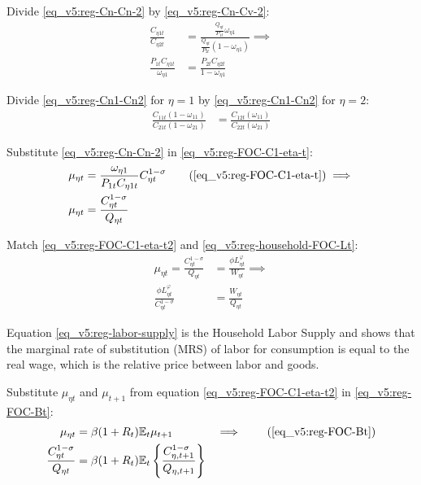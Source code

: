 \documentclass[../thesis.tex]{subfiles}
\begin{document}
\begin{tcolorbox}[colback=red!5!white,colframe=red!75!black]

Divide \ref{eq_v5:reg-Cn-Cn-2} by \ref{eq_v5:reg-Cn-Cv-2}:
\begin{align}
	\frac{C_{\eta 1 t}}{C_{\eta 2 t}} &= \frac{\frac{Q_{\eta t}}{P_{1 t}} \omega_{\eta 1}}{\frac{Q_{\eta t}}{P_{2 t}} (1 -\omega_{\eta 1})} \implies \nonumber \\
	\frac{P_{1 t} C_{\eta 1 t}}{\omega_{\eta 1}} &= \frac{P_{2 t} C_{\eta 2 t}}{1 -\omega_{\eta 1}} \label{eq_v5:reg-Cn1-Cn2}
\end{align}

Divide \ref{eq_v5:reg-Cn1-Cn2} for $\eta = 1$ by \ref{eq_v5:reg-Cn1-Cn2} for $\eta = 2$:
\begin{align}
	\frac{C_{11t}(1-\omega_{11})}{C_{21t}(1-\omega_{21})} &= \frac{C_{12t}(\omega_{11})}{C_{22t}(\omega_{21})} \label{eq_v5:reg-Cn1-Cn2-b}
\end{align}

\end{tcolorbox}

Substitute \ref{eq_v5:reg-Cn-Cn-2} in \ref{eq_v5:reg-FOC-C1-eta-t}:
\begin{align}
	\mu_{\eta t} &= \frac{\omega_{\eta 1}}{P_{1 t} C_{\eta 1 t}} C_{\eta t}^{1 -\sigma} \tag{\ref{eq_v5:reg-FOC-C1-eta-t}} \implies \\
	\mu_{\eta t} &= \frac{ C_{\eta t}^{1-\sigma}}{Q_{\eta t}} \label{eq_v5:reg-FOC-C1-eta-t2}
\end{align}

Match \ref{eq_v5:reg-FOC-C1-eta-t2} and \ref{eq_v5:reg-household-FOC-Lt}:
\begin{align}
	\mu_{\eta t} = \frac{ C_{\eta t}^{1-\sigma}}{Q_{\eta t}} &= \frac{\phi L_{\eta t}^{\varphi}}{W_{\eta t}} \implies \nonumber \\
	\frac{\phi L_{\eta t}^{\varphi}}{C_{\eta t}^{1-\sigma}} &= \frac{W_{\eta t}}{Q_{\eta t}} \label{eq_v5:reg-labor-supply}
\end{align}

Equation \ref{eq_v5:reg-labor-supply} is the Household Labor Supply and shows that the marginal rate of substitution (MRS) of labor for consumption is equal to the real wage, which is the relative price between labor and goods.

Substitute $\mu_{\eta t}$ and $\mu_{t+1}$ from equation \ref{eq_v5:reg-FOC-C1-eta-t2} in \ref{eq_v5:reg-FOC-Bt}:
\begin{alignat}{2}
	\mu_{\eta t} &= \beta (1 + R_{t}) \E{ \mu_{t+1}} &\implies \tag{\ref{eq_v5:reg-FOC-Bt}} 
	\\
	\frac{ C_{\eta t}^{1-\sigma}}{Q_{\eta t}} &= \beta (1 + R_{t}) \E \left\{ \frac{ C_{\eta, t+1}^{1-\sigma}}{Q_{\eta, t+1}} \right\} \label{eq_v5:reg-bonds-euler-equation}
\end{alignat}
\end{document}
